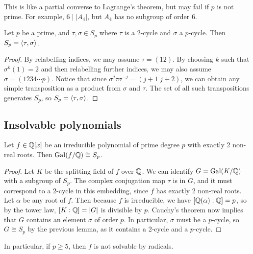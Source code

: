 \begin{remark}
    This is like a partial converse to Lagrange's theorem, but may fail if $p$ is not prime. For example, $6 \mid |A_4|$, but $A_4$ has no subgroup of order 6.
\end{remark}

\begin{lemma}
    Let $p$ be a prime, and $\tau, \sigma \in S_p$ where $\tau$ is a 2-cycle and $\sigma$ a $p$-cycle. Then $S_p = \langle {\tau, \sigma} \rangle$.
\end{lemma}

\begin{proof}
    By relabelling indices, we may assume $\tau = (12)$. By choosing $k$ such that $\sigma^k(1) = 2$ and then relabelling further indices, we may also assume $\sigma = (1234 \cdots p)$. Notice that since $\sigma^j \tau \sigma^{-j} = (j + 1 \; j + 2)$, we can obtain any simple transposition as a product from $\sigma$ and $\tau$. The set of all such transpositions generates $S_p$, so $S_p = \langle {\tau, \sigma} \rangle$.
\end{proof}

\subsection{Insolvable polynomials}

\begin{proposition}
    Let $f \in \mathbb{{Q}}[x]$ be an irreducible polynomial of prime degree $p$ with exactly 2 non-real roots. Then $\operatorname{Gal}(f/\mathbb{{Q}}) \cong S_p$.
\end{proposition}

\begin{proof}
    Let $K$ be the splitting field of $f$ over $\mathbb{{Q}}$. We can identify $G = \operatorname{Gal}(K/\mathbb{{Q}})$ with a subgroup of $S_p$. The complex conjugation map $\tau$ is in $G$, and it must correspond to a 2-cycle in this embedding, since $f$ has exactly 2 non-real roots. Let $\alpha$ be any root of $f$. Then because $f$ is irreducible, we have $[\mathbb{{Q}}(\alpha) : \mathbb{{Q}}] = p$, so by the tower law, $[K : \mathbb{{Q}}] = |G|$ is divisible by $p$. Cauchy's theorem now implies that $G$ contains an element $\sigma$ of order $p$. In particular, $\sigma$ must be a $p$-cycle, so $G \cong S_p$ by the previous lemma, as it contains a 2-cycle and a $p$-cycle.
\end{proof}

\begin{remark}
    In particular, if $p \geq 5$, then $f$ is not solvable by radicals.
\end{remark}

